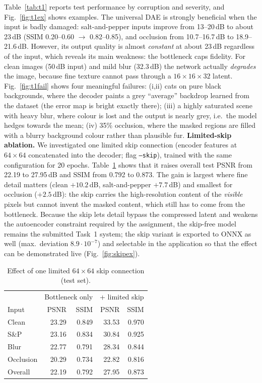 \documentclass[conference]{IEEEtran}
\begin{document}
Table~\ref{tab:t1} reports test performance by corruption and severity, and Fig.~\ref{fig:t1ex} shows examples. The universal DAE is strongly beneficial when the input is badly damaged: salt-and-pepper inputs improve from 13--20\,dB to about 23\,dB (SSIM 0.20--0.60 $\rightarrow$ 0.82--0.85), and occlusion from 10.7--16.7\,dB to 18.9--21.6\,dB. However, its output quality is almost \emph{constant} at about 23\,dB regardless of the input, which reveals its main weakness: the bottleneck caps fidelity. For clean images (50\,dB input) and mild blur (32.3\,dB) the network actually \emph{degrades} the image, because fine texture cannot pass through a $16{\times}16{\times}32$ latent. Fig.~\ref{fig:t1fail} shows four meaningful failures: (i,ii) cats on pure black backgrounds, where the decoder paints a grey ``average'' backdrop learned from the dataset (the error map is bright exactly there); (iii) a highly saturated scene with heavy blur, where colour is lost and the output is nearly grey, i.e.\ the model hedges towards the mean; (iv) 35\% occlusion, where the masked regions are filled with a blurry background colour rather than plausible fur. \textbf{Limited-skip ablation.} We investigated one limited skip connection (encoder features at $64{\times}64$ concatenated into the decoder; flag \texttt{--skip}), trained with the same configuration for 20 epochs. Table~\ref{tab:skip} shows that it raises overall test PSNR from 22.19 to 27.95\,dB and SSIM from 0.792 to 0.873. The gain is largest where fine detail matters (clean $+10.2$\,dB, salt-and-pepper $+7.7$\,dB) and smallest for occlusion ($+2.5$\,dB): the skip carries the high-resolution content of the \emph{visible} pixels but cannot invent the masked content, which still has to come from the bottleneck. Because the skip lets detail bypass the compressed latent and weakens the autoencoder constraint required by the assignment, the skip-free model remains the submitted Task~1 system; the skip variant is exported to ONNX as well (max.\ deviation $8.9\cdot10^{-7}$) and selectable in the application so that the effect can be demonstrated live (Fig.~\ref{fig:skipex}).
\begin{table}[t]\centering\caption{Effect of one limited $64{\times}64$ skip connection (test set).}\label{tab:skip}\setlength{\tabcolsep}{4pt}
\begin{tabular}{lrrrr}\toprule
 & \multicolumn{2}{c}{Bottleneck only} & \multicolumn{2}{c}{+ limited skip} \\
Input & PSNR & SSIM & PSNR & SSIM \\ \midrule
Clean & 23.29 & 0.849 & 33.53 & 0.970 \\
S\&P & 23.16 & 0.834 & 30.84 & 0.925 \\
Blur & 22.77 & 0.791 & 28.34 & 0.844 \\
Occlusion & 20.29 & 0.734 & 22.82 & 0.816 \\
Overall & 22.19 & 0.792 & 27.95 & 0.873 \\ \bottomrule
\end{tabular}\end{table}
\end{document}
